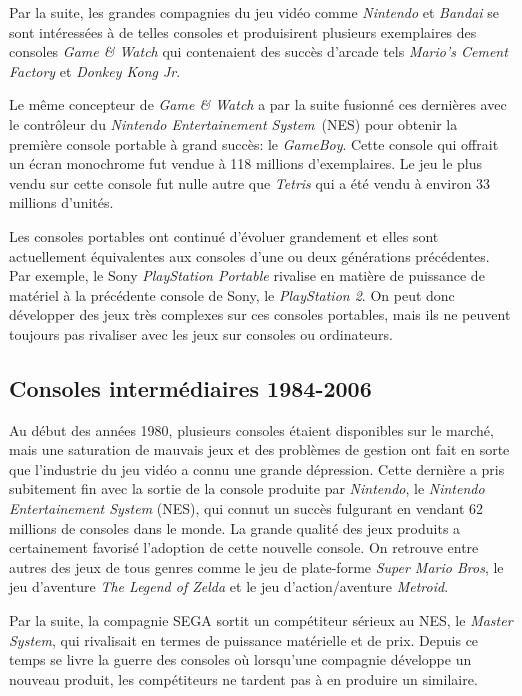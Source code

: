 \documentclass[12pt,twoside,letterpaper,francais]{book}
\begin{document}
Par la suite, les grandes compagnies du jeu vidéo comme
\textit{Nintendo} et \textit{Bandai} se sont intéressées à de telles
consoles et produisirent plusieurs exemplaires des consoles
\textit{Game \& Watch} qui contenaient des succès d'arcade tels
\textit{Mario's Cement Factory} et \textit{Donkey Kong Jr}.

Le même concepteur de \textit{Game \& Watch} a par la suite fusionné
ces dernières avec le contrôleur du \textit{Nintendo Entertainement
  System}~(NES) pour obtenir la première console portable à grand
succès: le \textit{GameBoy}. Cette console qui offrait un écran
monochrome fut vendue à 118 millions d'exemplaires. Le jeu le plus
vendu sur cette console fut nulle autre que \textit{Tetris} qui a été
vendu à environ 33 millions d'unités.

Les consoles portables ont continué d'évoluer grandement et elles sont
actuellement équivalentes aux consoles d'une ou deux générations
précédentes. Par exemple, le Sony \textit{PlayStation Portable}
rivalise en matière de puissance de matériel à la précédente console
de Sony, le \textit{PlayStation 2}. On peut donc développer des jeux
très complexes sur ces consoles portables, mais ils ne peuvent
toujours pas rivaliser avec les jeux sur consoles ou ordinateurs.


\FloatBarrier
\subsection{Consoles intermédiaires 1984-2006}
Au début des années 1980, plusieurs consoles étaient disponibles sur
le marché, mais une saturation de mauvais jeux et des problèmes de
gestion ont fait en sorte que l'industrie du jeu vidéo a connu une
grande dépression. Cette dernière a pris subitement fin avec la sortie
de la console produite par \textit{Nintendo}, le \textit{Nintendo
  Entertainement System} (NES), qui connut un succès fulgurant en
vendant 62 millions de consoles dans le monde. La grande qualité des
jeux produits a certainement favorisé l'adoption de cette nouvelle
console. On retrouve entre autres des jeux de tous genres comme le jeu
de plate-forme \textit{Super Mario Bros}, le jeu d'aventure
\textit{The Legend of Zelda} et le jeu d'action/aventure
\textit{Metroid}.

Par la suite, la compagnie SEGA sortit un compétiteur sérieux au NES,
le \textit{Master System}, qui rivalisait en termes de puissance
matérielle et de prix. Depuis ce temps se livre la guerre des consoles
où lorsqu'une compagnie développe un nouveau produit, les compétiteurs
ne tardent pas à en produire un similaire.
\end{document}
